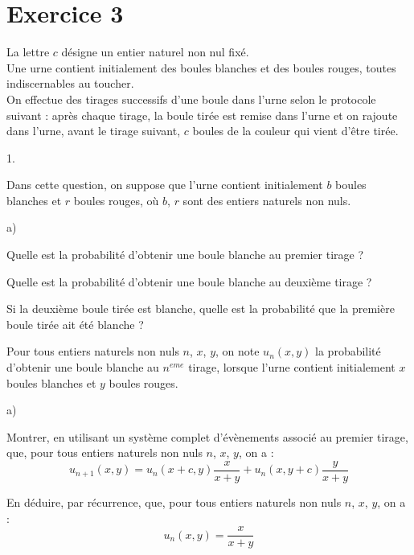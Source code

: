 \documentclass[11pt]{article}%
\begin{document}
\section*{Exercice 3}

\noindent La lettre $c$ désigne un entier naturel non nul fixé.\\
Une urne contient initialement des boules blanches et des boules
rouges,
toutes indiscernables au toucher.\\
On effectue des tirages successifs d'une boule dans l'urne selon le
protocole suivant : après chaque tirage, la boule tirée est remise
dans l'urne et on rajoute dans l'urne, avant le tirage suivant, $c$
boules
de la couleur qui vient d'être tirée.

\begin{noliste}{1.}
 \setlength{\itemsep}{4mm}
\item Dans cette question, on suppose que l'urne contient initialement
$b$
boules blanches et $r$ boules rouges, où $b$, $r$ sont des entiers
naturels non nuls.

\begin{noliste}{a)}
 \setlength{\itemsep}{2mm}
\item Quelle est la probabilité d'obtenir une boule blanche au premier
tirage ?

\item Quelle est la probabilité d'obtenir une boule blanche au deuxième
tirage ?

\item Si la deuxième boule tirée est blanche, quelle est la
probabilité que la première boule tirée ait été blanche ?
\end{noliste}

\item Pour tous entiers naturels non nuls $n$, $x$, $y$, on note
$u_{n}(x,y)$
la probabilité d'obtenir une boule blanche au $n^{eme}$ tirage, lorsque
l'urne contient initialement $x$ boules blanches et $y$ boules rouges.

\begin{noliste}{a)}
 \setlength{\itemsep}{2mm}
\item Montrer, en utilisant un système complet d'évènements
associé au premier tirage, que, pour tous entiers naturels non nuls
$n$, 
$x$, $y$, on a : 
\[
u_{n + 1}(x,y) = u_{n}(x + c,y)\dfrac{x}{x + y} + u_{n}(x,y +
c)\dfrac{y}{x + y}
\]

\item En déduire, par récurrence, que, pour tous entiers naturels
non nuls $n$, $x$, $y$, on a : 
\[
u_{n}(x,y) = \dfrac{x}{x + y}
\]
\end{noliste}


\end{noliste}
\end{document}
